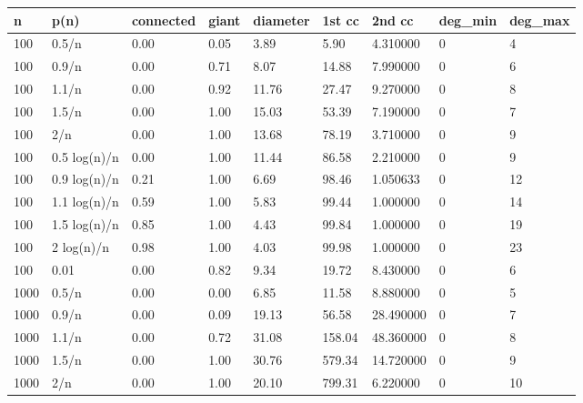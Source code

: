 \begin{table}[ht!]
	\centering
	\small
	\begin{tabular}{l|l|l|l|l|l|l|l|l}
	\toprule
	n &          p(n) &  connected &  giant &  diameter &     1st cc &      2nd cc & deg\_min & deg\_max \\
	\midrule
	100 &         0.5/n &       0.00 &   0.05 &      3.89 &       5.90 &    4.310000 &       0 &       4 \\
	100 &         0.9/n &       0.00 &   0.71 &      8.07 &      14.88 &    7.990000 &       0 &       6 \\
	100 &         1.1/n &       0.00 &   0.92 &     11.76 &      27.47 &    9.270000 &       0 &       8 \\
	100 &         1.5/n &       0.00 &   1.00 &     15.03 &      53.39 &    7.190000 &       0 &       7 \\
	100 &           2/n &       0.00 &   1.00 &     13.68 &      78.19 &    3.710000 &       0 &       9 \\
	100 &  0.5 log(n)/n &       0.00 &   1.00 &     11.44 &      86.58 &    2.210000 &       0 &       9 \\
	100 &  0.9 log(n)/n &       0.21 &   1.00 &      6.69 &      98.46 &    1.050633 &       0 &      12 \\
	100 &  1.1 log(n)/n &       0.59 &   1.00 &      5.83 &      99.44 &    1.000000 &       0 &      14 \\
	100 &  1.5 log(n)/n &       0.85 &   1.00 &      4.43 &      99.84 &    1.000000 &       0 &      19 \\
	100 &    2 log(n)/n &       0.98 &   1.00 &      4.03 &      99.98 &    1.000000 &       0 &      23 \\
	100 &          0.01 &       0.00 &   0.82 &      9.34 &      19.72 &    8.430000 &       0 &       6 \\
	1000 &         0.5/n &       0.00 &   0.00 &      6.85 &      11.58 &    8.880000 &       0 &       5 \\
	1000 &         0.9/n &       0.00 &   0.09 &     19.13 &      56.58 &   28.490000 &       0 &       7 \\
	1000 &         1.1/n &       0.00 &   0.72 &     31.08 &     158.04 &   48.360000 &       0 &       8 \\
	1000 &         1.5/n &       0.00 &   1.00 &     30.76 &     579.34 &   14.720000 &       0 &       9 \\
	1000 &           2/n &       0.00 &   1.00 &     20.10 &     799.31 &    6.220000 &       0 &      10 \\

\end{tabular}
\end{table}
